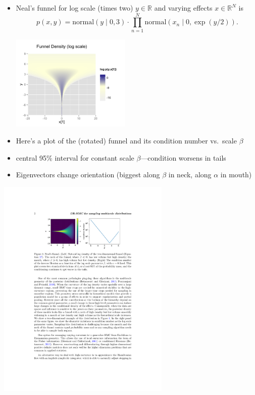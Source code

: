 \documentclass[10pt]{report}
\begin{document}
\begin{itemize}
  \item Neal's funnel for log scale (times two) $y \in \mathbb{R}$ and
    varying effects $x \in \mathbb{R}^N$ is
    $$ \textstyle 
    p(x, y) = \textrm{normal}(y \mid 0, 3) \cdot \prod_{n=1}^N 
    \textrm{normal}(x_n \mid 0, \exp(y / 2)). 
    $$
    \begin{center}
      \vspace*{-9pt}
    \includegraphics[width=2.25in]{img/funnel.png}
  \end{center}
\end{itemize}

\begin{itemize}
\item Here's a plot of the (rotated) funnel and its condition number
  vs.\ scale $\beta$
\item central 95\% interval for constant scale $\beta$---condition
  worsens in tails
\item Eigenvectors change orientation (biggest along $\beta$ in neck,
  along $\alpha$ in mouth)
\end{itemize}
\begin{center}
  \includegraphics[width=3.25in]{img/funnel-condition.pdf}
\end{center}
\end{document}
